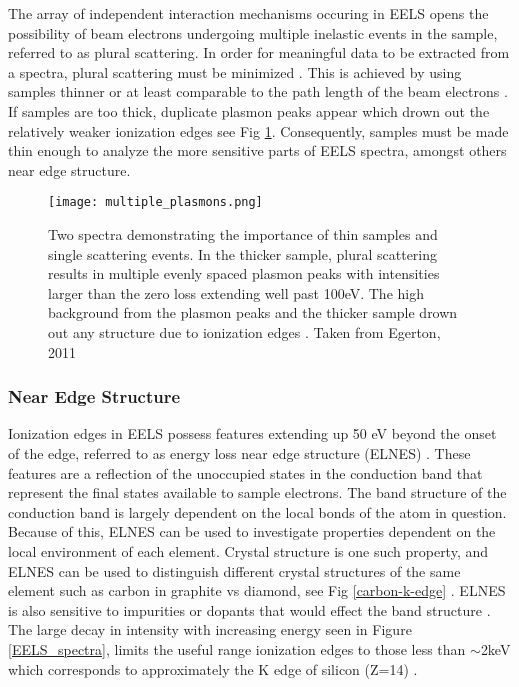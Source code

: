 The array of independent interaction mechanisms occuring in EELS opens the possibility of beam electrons undergoing multiple inelastic events in the sample, referred to as plural scattering.  In order for meaningful data to be extracted from a spectra, plural scattering must be minimized \cite{Egerton}. This is achieved by using samples thinner or at least comparable to the path length of the beam electrons \cite{Egerton}.  If samples are too thick, duplicate plasmon peaks appear which  drown out the relatively weaker ionization edges see Fig \ref{multiple_plasmons}.   Consequently, samples must be made thin enough to analyze the more sensitive parts of EELS spectra, amongst others near edge structure. \\

\begin{figure}
	\centering
	\texttt{[image: multiple\_plasmons.png]}
	\caption{Two spectra demonstrating the importance of thin samples and single scattering events. In the thicker sample, plural scattering results in multiple evenly spaced plasmon peaks with  intensities larger than the zero loss extending well past 100eV.  The high background from the plasmon peaks and the thicker sample drown out any structure due to ionization edges \cite{Egerton}. Taken from Egerton, 2011 \cite{Egerton}}
	\label{multiple_plasmons}
\end{figure}





\subsubsection{Near Edge Structure}
Ionization edges in EELS possess features extending up 50 eV beyond the onset of the edge, referred to as energy loss near edge structure (ELNES) \cite{Egerton}.   These features are a reflection of the unoccupied states in the conduction band that represent the final states available to sample electrons.  The band structure of the conduction band is largely dependent on the local bonds of the atom in question.  Because of this, ELNES can be used to investigate properties dependent on the local environment of each element.   Crystal structure is one such property, and ELNES can be used to distinguish different crystal structures of the same element such as carbon in graphite vs diamond, see Fig \ref{carbon-k-edge} \cite{hamon_elnes_2004}.  ELNES is also sensitive to impurities or dopants that would effect the band structure \cite{torrisi_atomic_2016}.  The large decay in intensity with increasing energy seen in Figure \ref{EELS_spectra}, limits the useful range ionization edges to those less than $\sim$2keV which corresponds to approximately the K edge of silicon (Z=14) \cite{reimer_transmission_2008}.  \\

